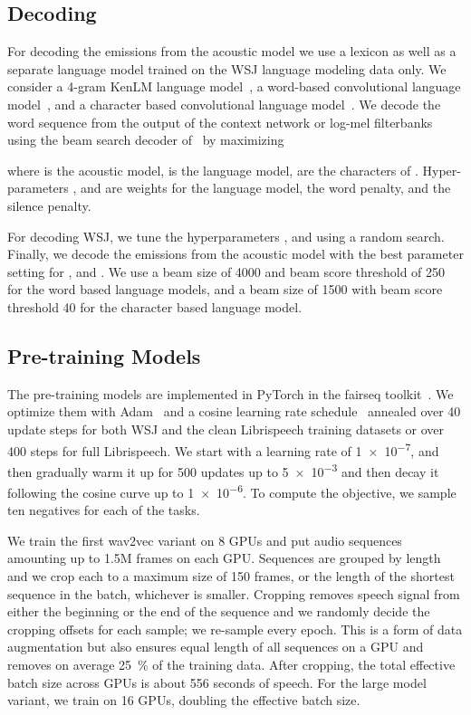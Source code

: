 \documentclass{article} \pdfoutput=1
\begin{document}
 
\subsection{Decoding}

For decoding the emissions from the acoustic model we use a lexicon as well as a separate language model trained on the WSJ language modeling data only. 
We consider a 4-gram KenLM language model~\citep{heafield2013kenlm}, a word-based convolutional language model~\citep{collobert2018diffbeam}, and a character based convolutional language model~\citep{likhomanenko2019convlm}.
We decode the word sequence  from the output of the context network  or log-mel filterbanks using the beam search decoder of~\citet{collobert2018diffbeam} by maximizing

where  is the acoustic model,  is the language model,  are the characters of . Hyper-parameters ,  and  are weights for the language model, the word penalty, and the silence penalty.

For decoding WSJ, we tune the hyperparameters ,  and  using a random search.
Finally, we decode the emissions from the acoustic model with the best parameter setting for ,  and .
We use a beam size of \num{4000} and beam score threshold of \num{250} for the word based language models, and a beam size of \num{1500} with beam score threshold \num{40} for the character based language model.

\subsection{Pre-training Models}
\label{sec:setup-pretrain}

The pre-training models are implemented in PyTorch in the fairseq toolkit~\citep{ott2019fairseq}.
We optimize them with Adam~\citep{kingma2015adam} and a cosine learning rate schedule~\citep{loshchilov2016cosine} annealed over 40\si{\kilo} update steps for both WSJ and the clean Librispeech training datasets or over 400\si{\kilo} steps for full Librispeech.
We start with a learning rate of \num[exponent-product = \times]{1e-7}, and then gradually warm it up for 500 updates up to \num[exponent-product = \times]{5e-3} and then decay it following the cosine curve up to \num[exponent-product = \times]{1e-6}.
To compute the objective, we sample ten negatives for each of the  tasks.

We train the first wav2vec variant on 8 GPUs and put audio sequences amounting up to 1.5M frames on each GPU.
Sequences are grouped by length and we crop each to a maximum size of {150}\si{\kilo} frames, or the length of the shortest sequence in the batch, whichever is smaller. 
Cropping removes speech signal from either the beginning or the end of the sequence and we randomly decide the cropping offsets for each sample; we re-sample every epoch.
This is a form of data augmentation but also ensures equal length of all sequences on a GPU and removes on average \SI{25}{\percent} of the training data.
After cropping, the total effective batch size across GPUs is about 556 seconds of speech. For the large model variant, we train on 16 GPUs, doubling the effective batch size.
\end{document}
